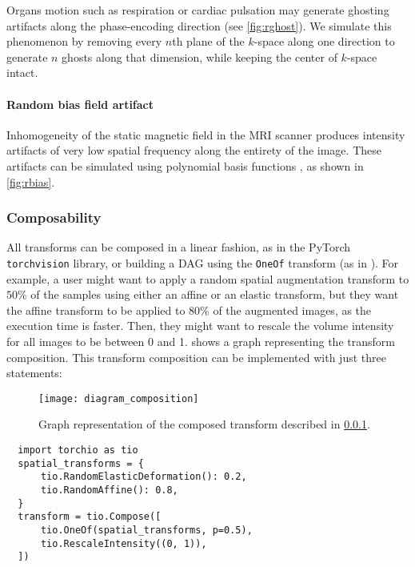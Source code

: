 Organs motion such as respiration or cardiac pulsation may generate ghosting artifacts along the phase-encoding direction \cite{zhuo_mr_2006} (see \cref{fig:rghost}).
We simulate this phenomenon by removing every $n$th plane of the $k$-space along one direction to generate $n$ ghosts along that dimension, while keeping the center of $k$-space intact.


\paragraph{Random bias field artifact}

Inhomogeneity of the static magnetic field in the \ac{MRI} scanner produces intensity artifacts of very low spatial frequency along the entirety of the image.
These artifacts can be simulated using polynomial basis functions \cite{van_leemput_automated_1999}, as shown in \cref{fig:rbias}.



\subsubsection{Composability}
\label{sec:composability}

All transforms can be composed in a linear fashion, as in the PyTorch \texttt{torchvision} library, or building a \ac{DAG} using the \texttt{OneOf} transform (as in \cite{buslaev_albumentations_2020}).
For example, a user might want to apply a random spatial augmentation transform to $50\%$ of the samples using either an affine or an elastic transform, but they want the affine transform to be applied to $80\%$ of the augmented images, as the execution time is faster.
Then, they might want to rescale the volume intensity for all images to be between 0 and 1.
 shows a graph representing the transform composition.
This transform composition can be implemented with just three statements:

\begin{figure}
  \centering
  \texttt{[image: diagram\_composition]}
  \caption[Graph representation of a composed transform]{
    Graph representation of the composed transform described in \cref{sec:composability}.
  }
  \label{fig:dag}
\end{figure}

\begin{verbatim}
  import torchio as tio
  spatial_transforms = {
      tio.RandomElasticDeformation(): 0.2,
      tio.RandomAffine(): 0.8,
  }
  transform = tio.Compose([
      tio.OneOf(spatial_transforms, p=0.5),
      tio.RescaleIntensity((0, 1)),
  ])
\end{verbatim}


